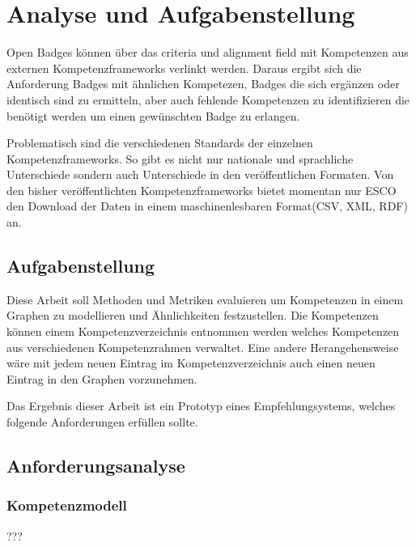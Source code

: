 \section{Analyse und Aufgabenstellung}\label{analysis}

Open Badges können über das criteria und alignment field mit Kompetenzen aus externen Kompetenzframeworks verlinkt werden. Daraus ergibt sich die Anforderung Badges mit ähnlichen Kompetezen, Badges die sich ergänzen oder identisch sind zu ermitteln, aber auch fehlende Kompetenzen zu identifizieren die benötigt werden um einen gewünschten Badge zu erlangen. \cite{OBNO3-A2}


Problematisch sind die verschiedenen Standards der einzelnen Kompetenzframeworks. So gibt es nicht nur nationale und sprachliche Unterschiede sondern auch Unterschiede in den veröffentlichen Formaten. Von den bisher veröffentlichten Kompetenzframeworks bietet momentan nur ESCO den Download der Daten in einem maschinenlesbaren Format(CSV, XML, RDF) an. 
\vspace{1em}

\subsection{Aufgabenstellung}

Diese Arbeit soll Methoden und Metriken evaluieren um Kompetenzen in einem Graphen zu modellieren und Ähnlichkeiten festzustellen.  Die Kompetenzen können einem Kompetenzverzeichnis entnommen werden welches Kompetenzen aus verschiedenen Kompetenzrahmen verwaltet. Eine andere Herangehensweise wäre mit jedem neuen Eintrag im Kompetenzverzeichnis auch einen neuen Eintrag in den Graphen vorzunehmen. 

Das Ergebnis dieser Arbeit ist ein Prototyp eines Empfehlungsystems, welches folgende Anforderungen erfüllen sollte.



\subsection{Anforderungsanalyse} 

\subsubsection{Kompetenzmodell}

???


